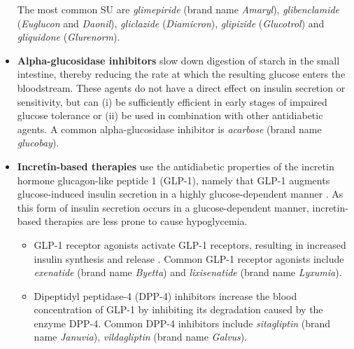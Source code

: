 \begin{itemize}
        The most common SU are \emph{glimepiride} (brand name \emph{Amaryl}), \emph{glibenclamide} (\emph{Euglucon} and \emph{Daonil}), \emph{gliclazide} (\emph{Diamicron}), \emph{glipizide} (\emph{Glucotrol}) and \emph{gliquidone} (\emph{Glurenorm}). \\
\item \textbf{Alpha-glucosidase inhibitors} slow down digestion of starch in the small intestine, thereby reducing the rate at which the resulting glucose enters the bloodstream. These agents do not have a direct effect on insulin secretion or sensitivity, but can (i) be sufficiently efficient in early stages of impaired glucose tolerance or (ii) be used in combination with other antidiabetic agents. 
A common alpha-glucosidase inhibitor is \emph{acarbose} (brand name \emph{glucobay}). \\
\item \textbf{Incretin-based therapies} use the antidiabetic properties of the incretin hormone glucagon-like peptide 1 (GLP-1), namely that GLP-1 augments glucose-induced insulin secretion in a highly glucose-dependent manner \citep{nauck2009incretin,lovshin2009incretin}. As this form of insulin secretion occurs in a glucose-dependent manner, incretin-based therapies are less prone to cause hypoglycemia.
\begin{itemize}
        \item GLP-1 receptor agonists activate GLP-1 receptors, resulting in increased insulin synthesis and release \citep{drucker1987glucagon}. Common GLP-1 receptor agonists include \emph{exenatide} (brand name \emph{Byetta}) and \emph{lixisenatide} (brand name \emph{Lyxumia}). \\
        \item Dipeptidyl peptidase-4 (DPP-4) inhibitors increase the blood concentration of GLP-1 by inhibiting its degradation caused by the enzyme DPP-4. Common DPP-4 inhibitors include \emph{sitagliptin} (brand name \emph{Januvia}), \emph{vildagliptin} (brand name \emph{Galvus}).  \\
\end{itemize}
\end{itemize} 



